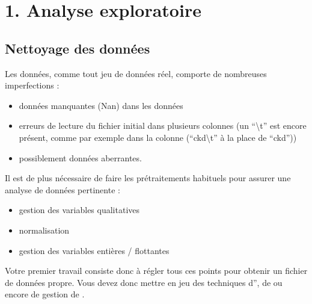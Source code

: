 \documentclass[letterpaper,10pt,french]{sphinxmanual}
\begin{document}
\section{1. Analyse exploratoire}
\label{\detokenize{TP/TP_etudiant:analyse-exploratoire}}

\subsection{Nettoyage des données}
\label{\detokenize{TP/TP_etudiant:nettoyage-des-donnees}}
\sphinxAtStartPar
Les données, comme tout jeu de données réel, comporte de nombreuses imperfections :
\begin{itemize}
\item {} 
\sphinxAtStartPar
données manquantes (Nan) dans les données

\item {} 
\sphinxAtStartPar
erreurs de lecture du fichier initial dans plusieurs colonnes (un “\textbackslash{}t” est encore présent, comme par exemple dans la colonne (“ckd\textbackslash{}t” à la place de “ckd”))

\item {} 
\sphinxAtStartPar
possiblement données aberrantes.

\end{itemize}

\sphinxAtStartPar
Il est de plus nécessaire de faire les pré\sphinxhyphen{}traitements habituels pour assurer une analyse de données pertinente :
\begin{itemize}
\item {} 
\sphinxAtStartPar
gestion des variables qualitatives

\item {} 
\sphinxAtStartPar
normalisation

\item {} 
\sphinxAtStartPar
gestion des variables entières / flottantes

\end{itemize}

\sphinxAtStartPar
Votre premier travail consiste donc à régler tous ces points pour obtenir un fichier de données propre. Vous devez donc mettre en jeu des techniques d”, de  ou encore de gestion de .
\end{document}
